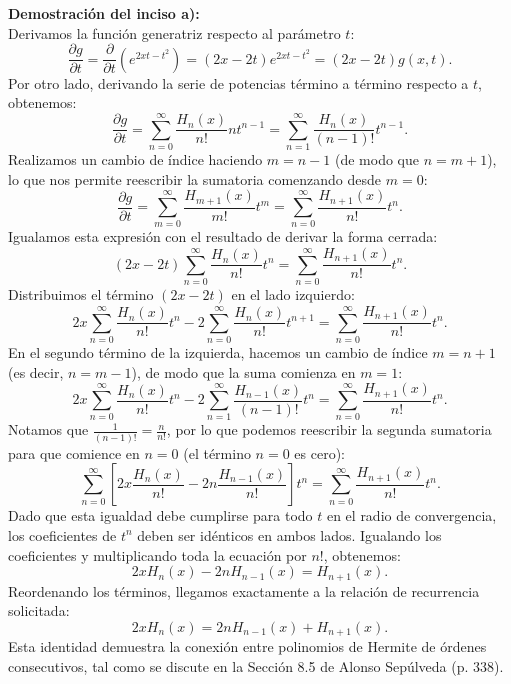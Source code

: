 \documentclass[a4paper]{article}
\begin{document}
\vspace{0.3cm}
\noindent\textbf{Demostración del inciso a):} \\
Derivamos la función generatriz respecto al parámetro $t$:
$$
\frac{\partial g}{\partial t} = \frac{\partial}{\partial t} \left( e^{2xt - t^2} \right) = (2x - 2t) e^{2xt - t^2} = (2x - 2t) g(x, t).
$$
Por otro lado, derivando la serie de potencias término a término respecto a $t$, obtenemos:
$$
\frac{\partial g}{\partial t} = \sum_{n=0}^{\infty} \frac{H_n(x)}{n!} n t^{n-1} = \sum_{n=1}^{\infty} \frac{H_n(x)}{(n-1)!} t^{n-1}.
$$
Realizamos un cambio de índice haciendo $m = n - 1$ (de modo que $n = m + 1$), lo que nos permite reescribir la sumatoria comenzando desde $m = 0$:
$$
\frac{\partial g}{\partial t} = \sum_{m=0}^{\infty} \frac{H_{m+1}(x)}{m!} t^m = \sum_{n=0}^{\infty} \frac{H_{n+1}(x)}{n!} t^n.
$$
Igualamos esta expresión con el resultado de derivar la forma cerrada:
$$
(2x - 2t) \sum_{n=0}^{\infty} \frac{H_n(x)}{n!} t^n = \sum_{n=0}^{\infty} \frac{H_{n+1}(x)}{n!} t^n.
$$
Distribuimos el término $(2x - 2t)$ en el lado izquierdo:
$$
2x \sum_{n=0}^{\infty} \frac{H_n(x)}{n!} t^n - 2 \sum_{n=0}^{\infty} \frac{H_n(x)}{n!} t^{n+1} = \sum_{n=0}^{\infty} \frac{H_{n+1}(x)}{n!} t^n.
$$
En el segundo término de la izquierda, hacemos un cambio de índice $m = n + 1$ (es decir, $n = m - 1$), de modo que la suma comienza en $m = 1$:
$$
2x \sum_{n=0}^{\infty} \frac{H_n(x)}{n!} t^n - 2 \sum_{n=1}^{\infty} \frac{H_{n-1}(x)}{(n-1)!} t^n = \sum_{n=0}^{\infty} \frac{H_{n+1}(x)}{n!} t^n.
$$
Notamos que $\frac{1}{(n-1)!} = \frac{n}{n!}$, por lo que podemos reescribir la segunda sumatoria para que comience en $n=0$ (el término $n=0$ es cero):
$$
\sum_{n=0}^{\infty} \left[ 2x \frac{H_n(x)}{n!} - 2n \frac{H_{n-1}(x)}{n!} \right] t^n = \sum_{n=0}^{\infty} \frac{H_{n+1}(x)}{n!} t^n.
$$
Dado que esta igualdad debe cumplirse para todo $t$ en el radio de convergencia, los coeficientes de $t^n$ deben ser idénticos en ambos lados. Igualando los coeficientes y multiplicando toda la ecuación por $n!$, obtenemos:
$$
2x H_n(x) - 2n H_{n-1}(x) = H_{n+1}(x).
$$
Reordenando los términos, llegamos exactamente a la relación de recurrencia solicitada:
$$
2x H_n(x) = 2n H_{n-1}(x) + H_{n+1}(x).
$$
Esta identidad demuestra la conexión entre polinomios de Hermite de órdenes consecutivos, tal como se discute en la Sección 8.5 de Alonso Sepúlveda (p. 338).
\end{document}
